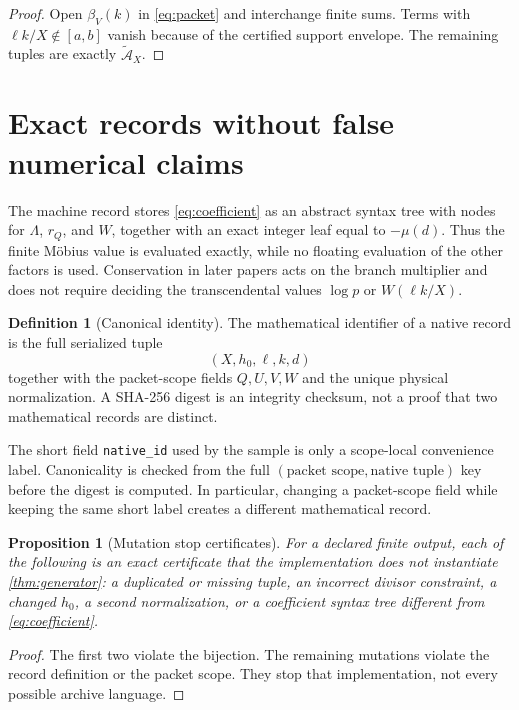 \documentclass[11pt]{article}
\newtheorem{proposition}[theorem]{Proposition}
\theoremstyle{definition}
\newtheorem{definition}[theorem]{Definition}
\theoremstyle{remark}
\newcommand{\At}{\widetilde{\mathcal A}}
\begin{document}
\begin{proof}
Open \(\beta_V(k)\) in \eqref{eq:packet} and interchange finite
sums.  Terms with \(\ell k/X\notin[a,b]\) vanish because of the
certified support envelope.  The remaining tuples are exactly
\(\At_X\).
\end{proof}

\section{Exact records without false numerical claims}

The machine record stores \eqref{eq:coefficient} as an abstract syntax
tree with nodes for \(\Lambda\), \(r_Q\), and \(W\), together with an
exact integer leaf equal to \(-\mu(d)\).  Thus the finite M\"obius
value is evaluated exactly, while no floating evaluation of the other
factors is used.
Conservation in later papers acts on the branch multiplier and does
not require deciding the transcendental values \(\log p\) or
\(W(\ell k/X)\).

\begin{definition}[Canonical identity]
The mathematical identifier of a native record is the full serialized
tuple
\[
 (X,h_0,\ell,k,d)
\]
together with the packet-scope fields \(Q,U,V,W\) and the unique
physical normalization.  A SHA-256 digest is an integrity checksum,
not a proof that two mathematical records are distinct.
\end{definition}

The short field \texttt{native\_id} used by the sample is only a
scope-local convenience label.  Canonicality is checked from the full
\((\text{packet scope},\text{native tuple})\) key before the digest is
computed.  In particular, changing a packet-scope field while keeping
the same short label creates a different mathematical record.

\begin{proposition}[Mutation stop certificates]
For a declared finite output, each of the following is an exact
certificate that the implementation does not instantiate
\cref{thm:generator}: a duplicated or missing tuple, an incorrect
divisor constraint, a changed \(h_0\), a second normalization, or a
coefficient syntax tree different from \eqref{eq:coefficient}.
\end{proposition}

\begin{proof}
The first two violate the bijection.  The remaining mutations violate
the record definition or the packet scope.  They stop that
implementation, not every possible archive language.
\end{proof}
\end{document}
